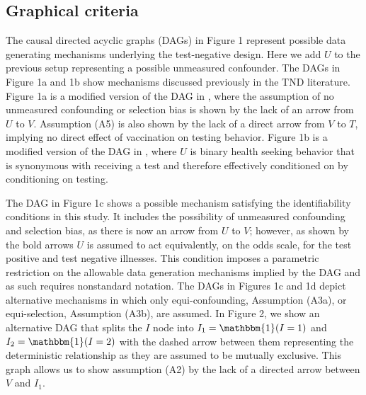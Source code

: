 \documentclass[11pt]{article}
\begin{document}
\subsection{Graphical criteria} \label{sec:graphical}
The causal directed acyclic graphs (DAGs) in Figure 1 represent possible data generating mechanisms underlying the test-negative design. Here we add $U$ to the previous setup representing a possible unmeasured confounder. The DAGs in Figure 1a and 1b show mechanisms discussed previously in the TND literature. Figure 1a is a modified version of the DAG in \citeauthor{schnitzer_estimands_2022} \cite{schnitzer_estimands_2022}, where the assumption of no unmeasured confounding or selection bias is shown by the lack of an arrow from $U$ to $V$. Assumption (A5) is also shown by the lack of a direct arrow from $V$ to $T$, implying no direct effect of vaccination on testing behavior. Figure 1b is a modified version of the DAG in \citeauthor{sullivan_theoretical_2016} \cite{sullivan_theoretical_2016}, where $U$ is binary health seeking behavior that is synonymous with receiving a test and therefore effectively conditioned on by conditioning on testing.  

The DAG in Figure 1c shows a possible mechanism satisfying the identifiability conditions in this study. It includes the possibility of unmeasured confounding and selection bias, as there is now an arrow from $U$ to $V$; however, as shown by the bold arrows $U$ is assumed to act equivalently, on the odds scale, for the test positive and test negative illnesses. This condition imposes a parametric restriction on the allowable data generation mechanisms implied by the DAG and as such requires nonstandard notation. The DAGs in Figures 1c and 1d depict alternative mechanisms in which only equi-confounding, Assumption (A3a), or equi-selection, Assumption (A3b), are assumed. In Figure 2, we show an alternative DAG that splits the $I$ node into $I_1 = \mathbbm{1}(I = 1)$ and $I_2 = \mathbbm{1}(I = 2)$ with the dashed arrow between them representing the deterministic relationship as they are assumed to be mutually exclusive. This graph allows us to show assumption (A2) by the lack of a directed arrow between $V$ and $I_1$. 
\end{document}
